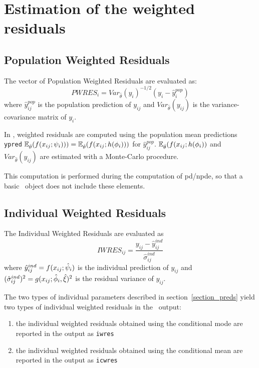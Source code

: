\section{Estimation of the weighted residuals} \label{section_wres}

\subsection{Population Weighted Residuals}
The vector of Population Weighted Residuals are evaluated as:
$$PWRES_{i} = Var_{\hat{\theta}}(y_{i})^{-1/2} \left( y_{i} - \hat{y}^{pop}_{i} \right)$$
where $\hat{y}^{pop}_{ij}$ is the population prediction of $y_{ij}$ and $Var_{\hat{\theta}}(y_{ij})$ is the variance-covariance matrix of $y_{i}$.

In \saemix, weighted residuals are computed using the population mean predictions \texttt{ypred} $\mathbb{E}_{\hat{\theta}}(f(x_{ij} ; {\psi_i}) ))=\mathbb{E}_{\hat{\theta}}(f(x_{ij} ; h({{\phi}_i}) ))$ for $\hat{y}^{pop}_{ij}$. $\mathbb{E}_{\hat{\theta}}(f(x_{ij} ; h({{\phi}_i})  )$ and $Var_{\hat{\theta}}(y_{ij})$ are estimated with a Monte-Carlo procedure.

 This computation is performed during the computation of pd/npde, so that a basic \saemix~object does not include these elements.


\subsection{Individual Weighted Residuals}

The Individual Weighted Residuals are evaluated as
$$IWRES_{ij} = \frac{y_{ij} - \hat{y}^{ind}_{ij}} {\hat{\sigma}^{ind}_{ij}}$$
where  $\hat{y}^{ind}_{ij} = f(x_{ij} ; \hat{\psi}_i )$ is the individual prediction of $y_{ij}$ and $(\hat{\sigma}^{ind}_{ij})^2 = g(x_{ij} ; \hat{{\phi}}_i,\hat{\xi})^2$ is the residual variance of $y_{ij}$.

The two types of individual parameters described in section~\ref{section_preds} yield two types of individual weighted residuals in the \saemix~output:
\begin{enumerate}
\item the individual weighted residuals obtained using the conditional mode are reported in the output as \texttt{iwres}
\item the individual weighted residuals obtained using the conditional mean are reported in the output as \texttt{icwres}
\end{enumerate}

